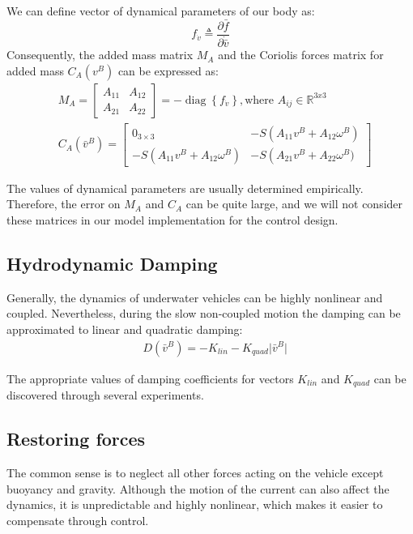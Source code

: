     We can define vector of dynamical parameters of our body as:
    $$
    f_{\dot{v}} \triangleq \frac{\partial \bar{f}}{\partial \dot{\bar{v}}}
    $$
    Consequently, the added mass matrix $M_A$ and 
    the Coriolis forces matrix for added mass $C_A(v^B)$
    can be expressed as: 
    $$
    \begin{aligned}
        & M_A=\left[\begin{array}{cc}
            A_{11} & A_{12} \\
            A_{21} & A_{22}
            \end{array}\right]=-\operatorname{diag}\left\{f_{\dot{v}}\right\}, \textrm{where } A_{ij} \in \mathbb{R}^{3 x 3} \\
        & C_A(\bar{v}^B)=\left[\begin{array}{cc}
        0_{3 \times 3} & -S\left(A_{11} v^B+A_{12} \omega^B\right) \\
        -S\left(A_{11} v^B+A_{12} \omega^B\right) & -S\left(A_{21} v^B+A_{22} \omega^B)\right.
        \end{array}\right]
    \end{aligned}
    $$

    The values of dynamical parameters are usually determined
    empirically. Therefore, the error on $M_A$ and $C_A$ can be quite large, and we will not consider
    these matrices in our model implementation for the control design.

\subsection{Hydrodynamic Damping}

    Generally, the dynamics of underwater vehicles can be highly nonlinear and coupled.
    Nevertheless, during the slow non-coupled motion the damping can be approximated to linear and quadratic damping:
    $$\begin{aligned}
        & D(\bar{v}^B)=-K_{lin} - K_{quad}\lvert \bar{v}^B \rvert
    \end{aligned}
    $$

    The appropriate values of damping coefficients for vectors $K_{lin}$ and $K_{quad}$ can be discovered through several experiments.

\subsection{Restoring forces}

    The common sense is to neglect all other forces acting on the vehicle except buoyancy and gravity. 
    Although the motion of the current can also affect the dynamics, it is unpredictable and highly nonlinear, 
    which makes it easier to compensate through control.


